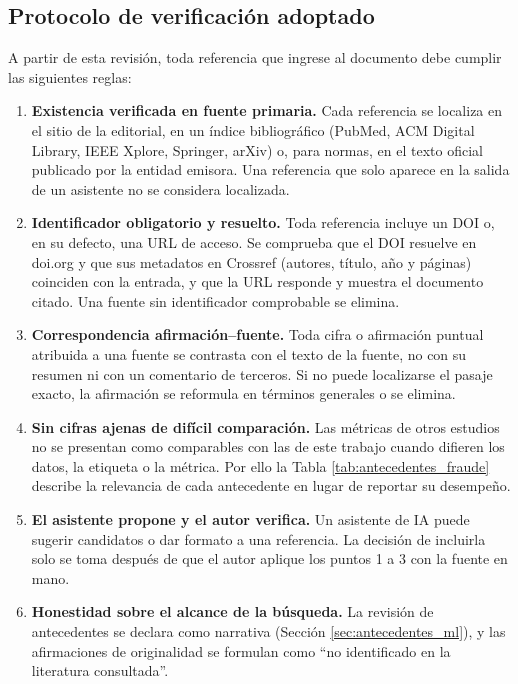 \documentclass[12pt,letterpaper]{report}
\begin{document}
\subsection{Protocolo de verificación adoptado}

A partir de esta revisión, toda referencia que ingrese al documento debe cumplir las
siguientes reglas:

\begin{enumerate}
    \item \textbf{Existencia verificada en fuente primaria.} Cada referencia se localiza
    en el sitio de la editorial, en un índice bibliográfico (PubMed, ACM Digital
    Library, IEEE Xplore, Springer, arXiv) o, para normas, en el texto oficial publicado
    por la entidad emisora. Una referencia que solo aparece en la salida de un asistente
    no se considera localizada.
    \item \textbf{Identificador obligatorio y resuelto.} Toda referencia incluye un DOI o,
    en su defecto, una URL de acceso. Se comprueba que el DOI resuelve en doi.org y que
    sus metadatos en Crossref (autores, título, año y páginas) coinciden con la entrada, y
    que la URL responde y muestra el documento citado. Una fuente sin identificador
    comprobable se elimina.
    \item \textbf{Correspondencia afirmación--fuente.} Toda cifra o afirmación puntual
    atribuida a una fuente se contrasta con el texto de la fuente, no con su resumen ni
    con un comentario de terceros. Si no puede localizarse el pasaje exacto, la
    afirmación se reformula en términos generales o se elimina.
    \item \textbf{Sin cifras ajenas de difícil comparación.} Las métricas de otros
    estudios no se presentan como comparables con las de este trabajo cuando difieren
    los datos, la etiqueta o la métrica. Por ello la
    Tabla \ref{tab:antecedentes_fraude} describe la relevancia de cada antecedente en
    lugar de reportar su desempeño.
    \item \textbf{El asistente propone y el autor verifica.} Un asistente de IA puede
    sugerir candidatos o dar formato a una referencia. La decisión de incluirla solo se
    toma después de que el autor aplique los puntos 1 a 3 con la fuente en mano.
    \item \textbf{Honestidad sobre el alcance de la búsqueda.} La revisión de
    antecedentes se declara como narrativa (Sección \ref{sec:antecedentes_ml}), y las
    afirmaciones de originalidad se formulan como ``no identificado en la literatura
    consultada''.
\end{enumerate}
\end{document}
